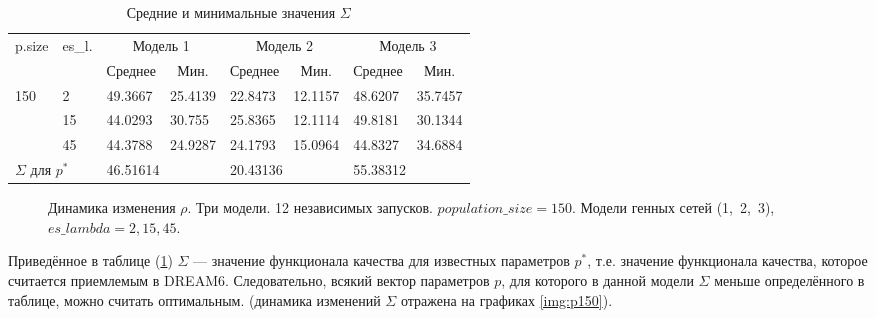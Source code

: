 \begin{table}[h]
\centering
\def\arraystretch{1.4} %
\begin{tabular}{|l|l|llllll|}
\hline %
  \multirow{2}{*}{p.size} & 
  \multirow{2}{*}{es\_l.} & 
  \multicolumn{2}{c|}{Модель 1} & 
  \multicolumn{2}{c|}{Модель 2} & 
  \multicolumn{2}{c|}{Модель 3} \\ \cline{3-8} 
  & & 
  \multicolumn{1}{c|}{Среднее} & 
  \multicolumn{1}{c|}{Мин.} & 
  \multicolumn{1}{c|}{Среднее} & 
  \multicolumn{1}{c|}{Мин.} & 
  \multicolumn{1}{c|}{Среднее} & 
  \multicolumn{1}{c|}{Мин.} \\ 

\hline %
\multirow{3}{*}{150} 
 & 2  & 49.3667 & 25.4139 & 22.8473 & 12.1157 & 48.6207 & 35.7457 \\ \cline{2-2}
 & 15 & 44.0293 & 30.755  & 25.8365 & 12.1114 & 49.8181 & 30.1344 \\ \cline{2-2}
 & 45 & 44.3788 & 24.9287 & 24.1793 & 15.0964 & 44.8327 & 34.6884 \\ 

\hline %
\multicolumn{2}{|l|}{$\Sigma$ для $p^*$} & 
\multicolumn{2}{l|}{46.51614} & 
\multicolumn{2}{l|}{20.43136} & 
\multicolumn{2}{l|}{55.38312} \\ 

\hline %
\end{tabular}
\caption{Средние и минимальные значения $\Sigma$}
\label{contable1}
\end{table}


\begin{figure}[h]
  \center{\texttt{[image: p150e]}}
  \caption{Динамика изменения $\rho$. Три модели. 12 независимых запусков. 
  $population\_size = 150$. Модели генных сетей (1,~2,~3), 
  $es\_lambda = 2, 15, 45$. }
  \label{img:p150e}
\end{figure}
\clearpage

Приведённое в таблице (\ref{contable1}) $\Sigma$ — значение функционала качества 
для известных параметров $p^*$, т.е. значение функционала качества, которое 
считается приемлемым в DREAM6. 
Следовательно, всякий вектор параметров $p$, для которого в данной модели 
$\Sigma$ меньше определённого в таблице, можно считать оптимальным. (динамика 
изменений $\Sigma$ отражена на графиках \ref{img:p150}).

